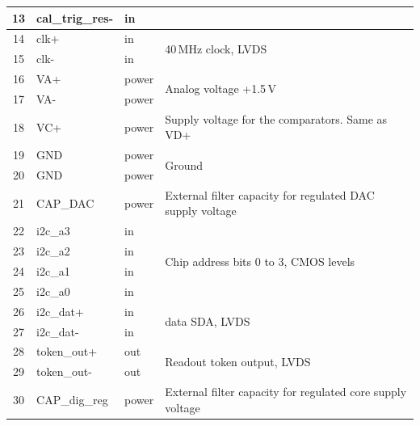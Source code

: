 \begin{table}[ht]
\begin{center}
{\begin{tabular}{clll}
	13 & cal\_trig\_res- & in  & \\
	\midrule %
	14 & clk+            & in  & \multirow{2}{*}{40\,MHz clock, LVDS} \\
	15 & clk-            & in  & \\
	\midrule %
	16 & VA+             & power  &\multirow{2}{*}{Analog voltage +1.5\,V} \\
	17 & VA-             & power  & \\
	\midrule %
	18 & VC+             & power  & Supply voltage for the comparators. Same as VD+ \\
	\midrule %
	19 & GND             & power  & \multirow{2}{*}{Ground} \\
	20 & GND             & power  & \\
	\midrule %
	21 & CAP\_DAC        & power & External filter capacity for regulated DAC supply voltage \\
	\midrule %
	22 & i2c\_a3         & in   & \multirow{4}{*}{Chip address bits 0 to 3, CMOS levels} \\
	23 & i2c\_a2         & in   & \\
	24 & i2c\_a1         & in   & \\
	25 & i2c\_a0         & in   & \\
	\midrule %
	26 & i2c\_dat+       & in & \multirow{2}{*}{\isqc{} data SDA, LVDS} \\
	27 & i2c\_dat-       & in  & \\
	\midrule %
	28 & token\_out+     & out & \multirow{2}{*}{Readout token output, LVDS} \\
	29 & token\_out-     & out & \\
	\midrule %
	30 & CAP\_dig\_reg   & power & External filter capacity for regulated core supply voltage \\

\end{tabular}}
\end{center}
\end{table}

